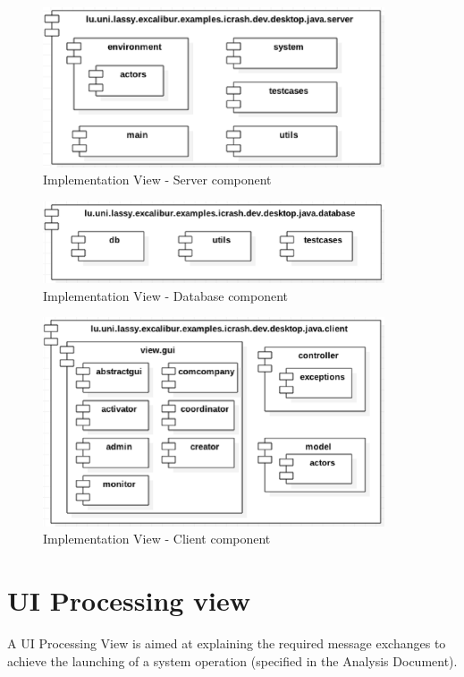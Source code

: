 \begin{figure}[h!]
	\centering
	\includegraphics[width=0.9\textwidth]{./images/impl_server.eps}
	\caption{Implementation View - Server component}
\end{figure}

\begin{figure}[h!]
	\centering
	\includegraphics[width=0.9\textwidth]{./images/impl_db.eps}
	\caption{Implementation View - Database component}
\end{figure}

\begin{figure}[h!]
	\centering
	\includegraphics[width=0.9\textwidth]{./images/impl_client.eps}
	\caption{Implementation View - Client component}
\end{figure}





\section{UI Processing view}
A \gls{UI Processing View} is aimed at explaining the required message
exchanges to achieve the launching of a system operation (specified in the \msrmessir
Analysis Document). 


